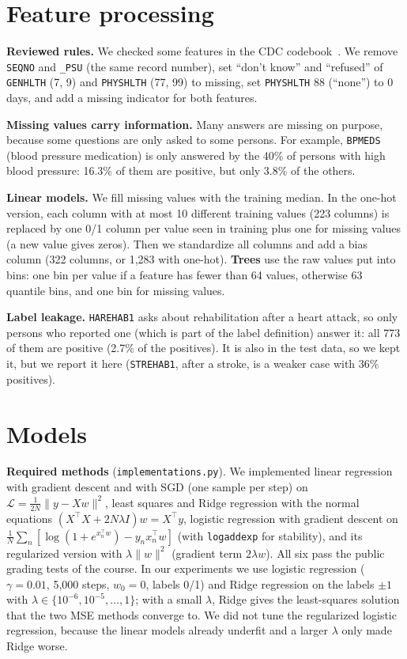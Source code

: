 \documentclass[10pt,conference,compsocconf]{IEEEtran}
\begin{document}
\section{Feature processing}
\textbf{Reviewed rules.} We checked some features in the CDC
codebook~\cite{brfss}. We remove \texttt{SEQNO} and \texttt{\_PSU} (the same
record number), set ``don't know'' and ``refused'' of \texttt{GENHLTH} (7, 9)
and \texttt{PHYSHLTH} (77, 99) to missing, set \texttt{PHYSHLTH} 88
(``none'') to 0 days, and add a missing indicator for both features.

\textbf{Missing values carry information.} Many answers are missing on
purpose, because some questions are only asked to some persons. For example,
\texttt{BPMEDS} (blood pressure medication) is only answered by the 40\% of
persons with high blood pressure: 16.3\% of them are positive, but only 3.8\%
of the others.

\textbf{Linear models.} We fill missing values with the training median. In
the one-hot version, each column with at most 10 different training values
(223 columns) is replaced by one 0/1 column per value seen in training plus
one for missing values (a new value gives zeros). Then we standardize all
columns and add a bias column (322 columns, or 1{,}283 with one-hot).
\textbf{Trees} use the raw values put into bins: one bin per value if a
feature has fewer than 64 values, otherwise 63 quantile bins, and one bin for
missing values.

\textbf{Label leakage.} \texttt{HAREHAB1} asks about rehabilitation after a
heart attack, so only persons who reported one (which is part of the label
definition) answer it: all 773 of them are positive (2.7\% of the positives).
It is also in the test data, so we kept it, but we report it here
(\texttt{STREHAB1}, after a stroke, is a weaker case with 36\% positives).

\section{Models}
\textbf{Required methods} (\texttt{implementations.py}). We implemented
linear regression with gradient descent and with SGD (one sample per step) on
$\mathcal{L}=\frac{1}{2N}\|y-Xw\|^2$, least squares and Ridge regression with
the normal equations $(X^\top X+2N\lambda I)w=X^\top y$, logistic regression
with gradient descent on $\frac{1}{N}\sum_n[\log(1+e^{x_n^\top w})-y_n x_n^\top
w]$ (with \texttt{logaddexp} for stability), and its regularized version with
$\lambda\|w\|^2$ (gradient term $2\lambda w$). All six pass the public grading
tests of the course. In our experiments we use logistic regression
($\gamma=0.01$, 5{,}000 steps, $w_0=0$, labels 0/1) and Ridge regression on
the labels $\pm1$ with $\lambda\in\{10^{-6},10^{-5},\dots,1\}$; with a small
$\lambda$, Ridge gives the least-squares solution that the two MSE methods
converge to. We did not tune the regularized logistic regression, because the
linear models already underfit and a larger $\lambda$ only made Ridge worse.
\end{document}
